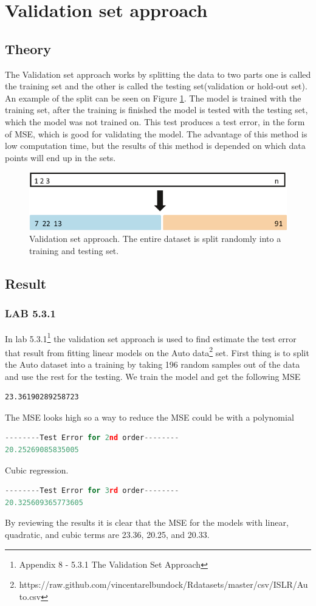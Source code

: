 
\section{Validation set approach}
\subsection{Theory}
The Validation set approach works by splitting the data to two parts one is called the training set and the other is called the testing set(validation or hold-out set). An example of the split can be seen on Figure \ref{fig:validationsetapproach}. The model is trained with the training set, after the training is finished the model is tested with the testing set, which the model was not trained on. This test produces a test error, in the form of MSE, which is good for validating the model. The advantage of this method is low computation time, but the results of this method is depended on which data points will end up in the sets. 
\begin{figure}[H]
	\centering
	\includegraphics[width=0.4\linewidth]{crossValidation/validationSetApproach}
	\caption{Validation set approach. The entire dataset is split randomly into a training and testing set.}
	\label{fig:validationsetapproach}
\end{figure}

\subsection{Result}
\subsubsection*{LAB 5.3.1}%
In lab 5.3.1\footnote{Appendix 8 - 5.3.1 The Validation Set Approach} the validation set approach is used to find estimate the test error that result from fitting linear models on the Auto data\footnote{https://raw.github.com/vincentarelbundock/Rdatasets/master/csv/ISLR/Auto.csv} set. First thing is to split the Auto dataset into a training by taking 196 random samples out of the data and use the rest for the testing. We train the model and get the following MSE
\begin{lstlisting}
23.36190289258723
\end{lstlisting}
The MSE looks high so a way to reduce the MSE could be with a polynomial 
\begin{lstlisting}[language=Python]
--------Test Error for 2nd order--------
20.25269085835005
\end{lstlisting}
Cubic regression.
\begin{lstlisting}[language=Python]
--------Test Error for 3rd order--------
20.325609365773605
\end{lstlisting}
By reviewing the results it is clear that the MSE for the models with linear, quadratic, and cubic terms are 23.36, 20.25, and 20.33.

